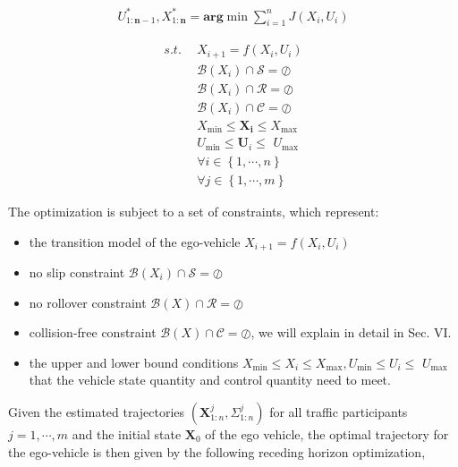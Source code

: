 \documentclass[conference]{IEEEtran}
\begin{document}
\begin{equation}
	\begin{aligned}
		U_{1:\boldsymbol{n}-1}^{*},X_{1:\boldsymbol{n}}^{*}=\boldsymbol{arg}\min \sum_{i=1}^n{}J\left( X_i,U_i \right)
	\end{aligned}	
\end{equation}
\begin{center}
	\begin{align}
	s.t.\ \ &X_{i+1}=f\left( X_i,U_i \right) \tag{1a}\\
		&\mathcal{B}\left( X_i \right) \cap \mathcal{S}=\oslash \tag{1b}\\
		&\mathcal{B}\left( X_i \right) \cap \mathcal{R}=\oslash \tag{1c}\\
		&\mathcal{B}\left( X_i \right) \cap \mathcal{C}=\oslash \tag{1d}\\
		&X_{\min}\leqslant \boldsymbol{X}_{\boldsymbol{i}}\leqslant X_{\max}	\tag{1e}\\
		&U_{\min}\leqslant \boldsymbol{U}_i\leqslant \,\,U_{\max} \tag{1f}\\
		&\forall i\in \left\{ 1,\cdots ,n \right\} 	\tag{1g}\\
		&\forall j\in \left\{ 1,\cdots ,m \right\}    \tag{1h}
	\end{align}
\end{center}

The optimization is subject to a set of constraints, which represent:
\begin{itemize}
	\item the transition model of the ego-vehicle  $X_{i+1}=f\left( X_i,U_i \right)$	
	\item no slip constraint $\mathcal{B}\left( X_i \right) \cap \mathcal{S}=\oslash$	
	\item no rollover constraint  $\mathcal{B}\left( X \right) \cap \mathcal{R}=\oslash$
	\item collision-free constraint  $\mathcal{B}\left( X \right) \cap \mathcal{C}=\oslash$, we will explain in detail in Sec. VI.	
	\item the upper and lower bound conditions $X_{\min}\leq X_i\leq X_{\max}, U_{\min}\leq U_i\leq \,\,U_{\max}$ that the vehicle state quantity and control quantity need to meet.
\end{itemize}

Given the estimated trajectories $\left( \boldsymbol{X}_{1:n}^{j},\boldsymbol{\varSigma }_{1:n}^{j} \right)$ for all traffic participants $j=1,\cdots ,m$ and the initial state $\boldsymbol{X}_0$ of the ego vehicle, the optimal trajectory for the ego-vehicle is then given by the following receding horizon optimization,
\end{document}
